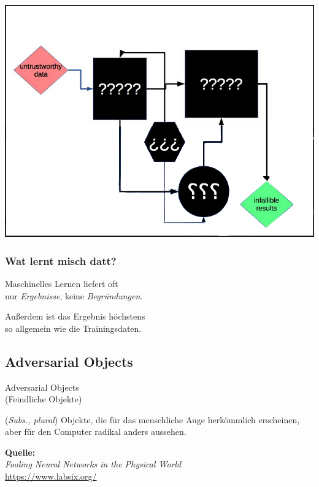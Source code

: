 \documentclass[aspectratio=169,x11names]{beamer}
\begin{document}
\begin{frame}
\begin{center}
\includegraphics[height=0.65\textheight,keepaspectratio]{images/deep_neural_networks_4.png} 
\end{center}
\end{frame}

\begin{frame}
\frametitle{Wat lernt misch datt?}
\begin{center}
\color{red}
\large
Maschinelles Lernen liefert oft\\nur \emph{Ergebnisse}, keine \emph{Begründungen}.
\pause\bigskip

Außerdem ist das Ergebnis höchstens\\so allgemein wie die Trainingsdaten.
\end{center}
\end{frame}


\subsection{Adversarial Objects}
\begin{frame}
\begin{center}
\huge
\glqq Adversarial Objects\grqq \\
\Large
(Feindliche Objekte)
\end{center}
\bigskip
\normalsize

(\textit{Subs., plural}) Objekte, die für das menschliche Auge herkömmlich erscheinen, aber für den Computer radikal anders aussehen.
\bigskip

\begin{center}
\textbf{Quelle:}\\
\emph{Fooling Neural Networks in the Physical World}\\
\url{https://www.labsix.org/}
\end{center}
\end{frame}
\end{document}
